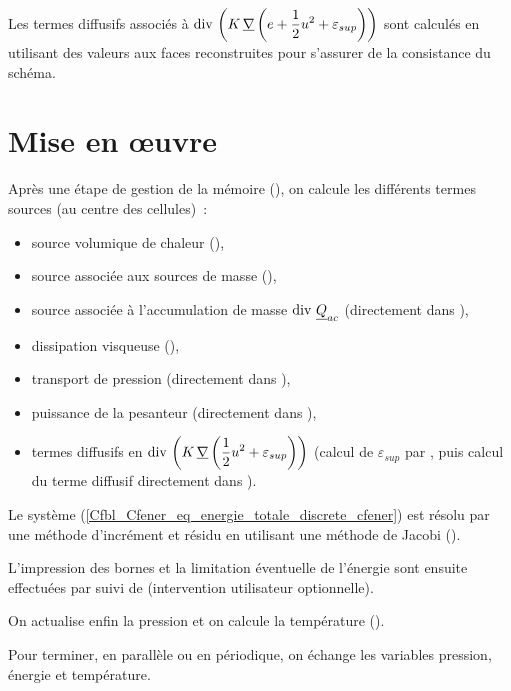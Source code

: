 Les termes diffusifs associ\'es \`a
$\displaystyle\text{div}\,\left(K\,\underline{\nabla}\left(e+\frac{1}{2} u^2 +
\varepsilon_{sup}\right)\right)$ sont calcul\'es en utilisant des valeurs aux
faces reconstruites pour s'assurer de la consistance du sch\'ema.

\section*{Mise en \oe uvre}


Apr\`es une \'etape de gestion de la m\'emoire (), on calcule les
diff\'erents termes sources (au centre des cellules)~:
\begin{itemize}
\item source volumique de chaleur (),
\item source associ\'ee aux sources de masse (),
\item source associ\'ee \`a l'accumulation de masse $\text{div}\,\,\underline{Q}_{ac}$ (directement dans ),
\item dissipation visqueuse (),
\item transport de pression (directement dans ),
\item puissance de la pesanteur (directement dans ),
\item termes diffusifs en $\displaystyle\text{div}\,\left(K\,\underline{\nabla}\left(\frac{1}{2} u^2 +
\varepsilon_{sup}\right)\right)$ (calcul de $\varepsilon_{sup}$ par
, puis calcul du terme diffusif directement dans ).
\end{itemize}

\bigskip
Le syst\`eme (\ref{Cfbl_Cfener_eq_energie_totale_discrete_cfener}) est r\'esolu par une m\'ethode
d'incr\'ement et r\'esidu  en utilisant une m\'ethode de Jacobi ().

L'impression des bornes et
la limitation \'eventuelle de l'\'energie sont ensuite effectu\'ees par
 suivi de  (intervention utilisateur optionnelle).

On actualise enfin la pression et on calcule la
temp\'erature ().

Pour
terminer, en parall\`ele ou en p\'eriodique, on \'echange les variables
pression, \'energie et temp\'erature.



